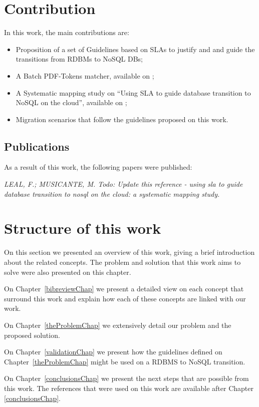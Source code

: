 \section{Contribution}

In this work, the main contributions are: 

\begin{itemize}
   \item{Proposition of a set of Guidelines based on SLAs to justify and and guide the transitions from RDBMs to NoSQL DBs;}
   \item{A Batch PDF-Tokens matcher, available on \cite{pythonBatchPDFTokenMatcher};}
   \item{A Systematic mapping study on ``Using SLA to guide database transition to NoSQL on the cloud'', available on \cite{fabioMartinSM};}
   \item{Migration scenarios that follow the guidelines proposed on this work.}
\end{itemize}

\subsection{Publications}

As a result of this work, the following papers were published:

\textit{LEAL, F.; MUSICANTE, M. Todo: Update this reference - using sla to guide database transition to nosql on the cloud: a systematic mapping study.}


\section{Structure of this work}
On this section we presented an overview of this work, giving a brief introduction about the related concepts. The problem and solution that this work aims to solve were also presented on this chapter. 

On Chapter~\ref{bibreviewChap} we present a detailed view on each concept that surround this work and explain how each of these concepts are linked with our work. 

On Chapter~\ref{theProblemChap} we extensively detail our problem and the proposed solution.

On Chapter~\ref{validationChap} we present how the guidelines defined on Chapter~\ref{theProblemChap} might be used on a RDBMS to NoSQL transition. 

On Chapter~\ref{conclusionsChap} we present the next steps that are possible from this work. The references that were used on this work are available after Chapter \ref{conclusionsChap}.  